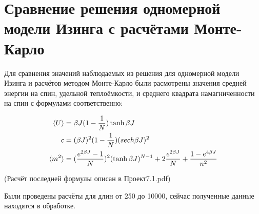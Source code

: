 \section{Сравнение решения одномерной модели Изинга с расчётами Монте-Карло}

Для сравнения значений наблюдаемых из решения для одномерной модели Изинга и расчётов методом Монте-Карло были расмотрены значения средней энергии на спин, удельной теплоёмкости, и среднего квадрата намагниченности на спин с формулами соответственно: 

\begin{align*}
    \langle U \rangle &= \beta J (1 - \frac{1}{N}) \tanh{\beta J} \\
    c &= (\beta J)^{2} (1 - \frac{1}{N}) (sech \beta J )^{2} \\
    \langle m^{2} \rangle &= (\frac{e^{2\beta J} - 1}{N})^{2} (\tanh{\beta J})^{N-1} + 2 \frac{e^{2\beta J}}{N} + \frac{1 - e^{4\beta J}}{n^2}
\end{align*}

(Расчёт последней формулы описан в Проект7.1.pdf\cite{web:ProjectMagnetRepos})

Были проведены расчёты для длин от 250 до 10000, сейчас полученные данные находятся в обработке.
